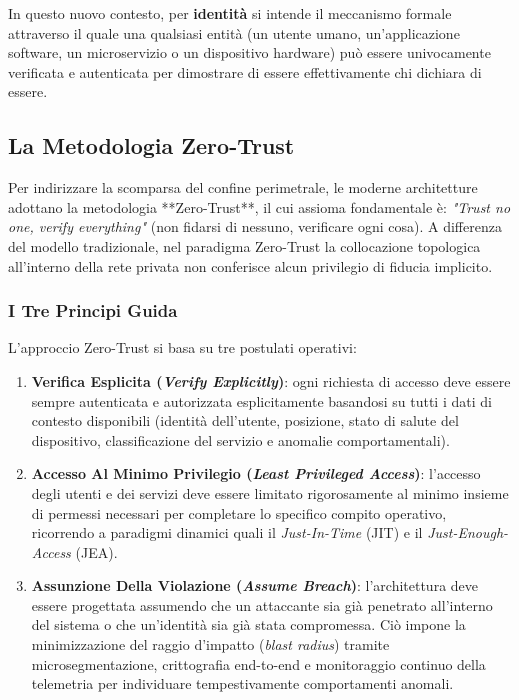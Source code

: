 \documentclass[11pt, a4paper]{article}
\begin{document}

In questo nuovo contesto, per \textbf{identità} si intende il meccanismo formale attraverso il quale una qualsiasi entità (un utente umano, un'applicazione software, un microservizio o un dispositivo hardware) può essere univocamente verificata e autenticata per dimostrare di essere effettivamente chi dichiara di essere.

\subsection{La Metodologia Zero-Trust}

Per indirizzare la scomparsa del confine perimetrale, le moderne architetture adottano la metodologia **Zero-Trust**, il cui assioma fondamentale è: \emph{"Trust no one, verify everything"} (non fidarsi di nessuno, verificare ogni cosa). A differenza del modello tradizionale, nel paradigma Zero-Trust la collocazione topologica all'interno della rete privata non conferisce alcun privilegio di fiducia implicito.


\subsubsection{I Tre Principi Guida}

L'approccio Zero-Trust si basa su tre postulati operativi:
\begin{enumerate}[leftmargin=*]
    \item \textbf{Verifica Esplicita (\emph{Verify Explicitly})}: ogni richiesta di accesso deve essere sempre autenticata e autorizzata esplicitamente basandosi su tutti i dati di contesto disponibili (identità dell'utente, posizione, stato di salute del dispositivo, classificazione del servizio e anomalie comportamentali).
    \item \textbf{Accesso Al Minimo Privilegio (\emph{Least Privileged Access})}: l'accesso degli utenti e dei servizi deve essere limitato rigorosamente al minimo insieme di permessi necessari per completare lo specifico compito operativo, ricorrendo a paradigmi dinamici quali il \emph{Just-In-Time} (JIT) e il \emph{Just-Enough-Access} (JEA).
    \item \textbf{Assunzione Della Violazione (\emph{Assume Breach})}: l'architettura deve essere progettata assumendo che un attaccante sia già penetrato all'interno del sistema o che un'identità sia già stata compromessa. Ciò impone la minimizzazione del raggio d'impatto (\emph{blast radius}) tramite microsegmentazione, crittografia end-to-end e monitoraggio continuo della telemetria per individuare tempestivamente comportamenti anomali.
\end{enumerate}
\end{document}
